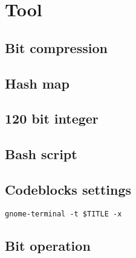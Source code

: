 \section{Tool}
\subsection{Bit compression}

\subsection{Hash map}

\subsection{120 bit integer}

\subsection{Bash script}

\subsection{Codeblocks settings}
	\begin{lstlisting}
gnome-terminal -t $TITLE -x
	\end{lstlisting}
\subsection{Bit operation}
